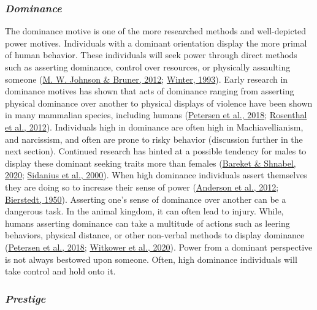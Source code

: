 \documentclass[
  donotrepeattitle,doc, 12pt, a4paper,floatsintext]{apa7}
\begin{document}
\hypertarget{dominance}{%
\subsubsection{\texorpdfstring{\emph{Dominance}}{Dominance}}\label{dominance}}
The dominance motive is one of the more researched methods and well-depicted power motives. Individuals with a dominant orientation display the more primal of human behavior. These individuals will seek power through direct methods such as asserting dominance, control over resources, or physically assaulting someone (\protect\hyperlink{ref-johnson2012}{M. W. Johnson \& Bruner, 2012}; \protect\hyperlink{ref-winter1993}{Winter, 1993}). Early research in dominance motives has shown that acts of dominance ranging from asserting physical dominance over another to physical displays of violence have been shown in many mammalian species, including humans (\protect\hyperlink{ref-petersen2018}{Petersen et al., 2018}; \protect\hyperlink{ref-rosenthal2012}{Rosenthal et al., 2012}).
Individuals high in dominance are often high in Machiavellianism, and narcissism, and often are prone to risky behavior (discussion further in the next section). Continued research has hinted at a possible tendency for males to display these dominant seeking traits more than females (\protect\hyperlink{ref-bareket2020}{Bareket \& Shnabel, 2020}; \protect\hyperlink{ref-sidanius2000}{Sidanius et al., 2000}). When high dominance individuals assert themselves they are doing so to increase their sense of power (\protect\hyperlink{ref-anderson2012}{Anderson et al., 2012}; \protect\hyperlink{ref-bierstedt1950}{Bierstedt, 1950}). Asserting one's sense of dominance over another can be a dangerous task. In the animal kingdom, it can often lead to injury. While, humans asserting dominance can take a multitude of actions such as leering behaviors, physical distance, or other non-verbal methods to display dominance (\protect\hyperlink{ref-petersen2018}{Petersen et al., 2018}; \protect\hyperlink{ref-witkower2020}{Witkower et al., 2020}). Power from a dominant perspective is not always bestowed upon someone. Often, high dominance individuals will take control and hold onto it.
\hypertarget{prestige}{%
\subsubsection{\texorpdfstring{\emph{Prestige}}{Prestige}}\label{prestige}}
\end{document}
